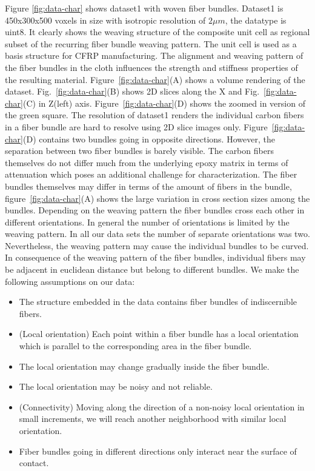 Figure \ref{fig:data-char} shows dataset1 with woven fiber bundles. Dataset1 is 450x300x500 voxels in size with isotropic resolution of $2\mu m$, the datatype is uint8. It clearly shows the weaving structure of the composite unit cell as regional subset of the recurring fiber bundle weaving pattern. The unit cell is used as a basis structure for CFRP manufacturing. The alignment and weaving pattern of the fiber bundles in the cloth influences the strength and stiffness properties of the resulting material. Figure~\ref{fig:data-char}(A) shows a volume rendering of the dataset. Fig.~\ref{fig:data-char}(B) shows 2D slices along the X and Fig.~\ref{fig:data-char}(C) in Z(left) axis. Figure~\ref{fig:data-char}(D) shows the zoomed in version of the green square. 
The resolution of dataset1 renders the individual carbon fibers in a fiber bundle are hard to resolve using 2D slice images only. Figure~\ref{fig:data-char}(D) contains two bundles going in opposite directions. However, the separation between two fiber bundles is barely visible. The carbon fibers themselves do not differ much from the underlying epoxy matrix in terms of attenuation which poses an additional challenge for characterization. The fiber bundles themselves may differ in terms of the amount of fibers in the bundle, figure~\ref{fig:data-char}(A) shows the large variation in cross section sizes among the bundles.
Depending on the weaving pattern the fiber bundles cross each other in different orientations. In general the number of orientations is limited by the weaving pattern. In all our data sets the number of separate orientations was two. Nevertheless, the weaving pattern may cause the individual bundles to be curved. In consequence of the weaving pattern of the fiber bundles, individual fibers may be adjacent in euclidean distance but belong to different bundles. 
We make the following assumptions on our data:
\begin{itemize}
\item The structure embedded in the data contains fiber bundles of indiscernible fibers.
\item (Local orientation) Each point within a fiber bundle has a local orientation which is parallel to the corresponding area in the fiber bundle.
\item The local orientation may change gradually inside the fiber bundle.
\item The local orientation may be noisy and not reliable.
\item (Connectivity) Moving along the direction of a non-noisy local orientation in small increments, we will reach another neighborhood with similar local orientation.
\item Fiber bundles going in different directions only interact near the surface of contact.
\end{itemize}
